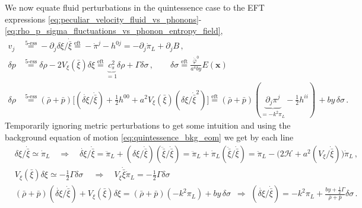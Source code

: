 We now equate fluid perturbations in the quintessence case to the EFT expressions \eqref{eq:peculiar_velocity_fluid_vs_phonons}-\eqref{eq:rho_p_sigma_fluctuations_vs_phonon_entropy_field},
{\small\begin{subequations}\label{eq:perturbations_5essence_vs_eft}
\begin{align}
    v_j & \overset{\text{5-ess}}{=} -\partial_j\delta\xi/\dot{\bar{\xi}} \overset{\text{eft}}{=} -\dot{\pi}^j - h^{0j} = -\partial_j\dot{\pi}_L +\partial_j B\,,\\[2.5pt]
    \delta p &\overset{\text{5-ess}}{=} \delta \rho -2V_\xi(\bar{\xi})\delta\xi 
    \overset{\text{eft}}{=}\underbrace{c_s^2}_{=1} \delta \rho + \Gamma \delta\sigma\,, \qquad \delta\sigma \overset{\text{eft}}{=} \tfrac{\dot{\bar{\varphi}}^0}{a^4by}E(\mathbf{x})\,\\[2.5pt]
    \delta\rho &\overset{\text{5-ess}}{=}(\bar{\rho}+\bar{p})\Big[(\dot{\delta\xi}/\dot{\bar{\xi}})+\tfrac12 h^{00} + a^2V_\xi(\bar{\xi})(\delta\xi/\dot{\bar{\xi}}^2) \Big]\overset{\text{eft}}{=} (\bar{\rho}+\bar{p})(\underbrace{\partial_j\pi^j}_{=-k^2\pi_L}-\tfrac12h^{ii})\,+by\,\delta\sigma\,.
\end{align}\end{subequations}}
Temporarily ignoring metric perturbations to get some intuition and using the background equation of motion \eqref{eq:quintessence_bkg_eom} we get by each line
{\small\begin{subequations}\label{eq:variables_5essence_vs_eft}
\begin{align}
    &\delta\xi/\dot{\bar{\xi}} \simeq \dot{\pi}_L \quad \Rightarrow\quad \dot{\delta\xi}/\dot{\bar{\xi}}=\ddot{\pi}_L+(\delta\xi/\dot{\bar{\xi}})(\ddot{\bar{\xi}}/\dot{\bar{\xi}})= \ddot{\pi}_L+\dot{\pi}_L(\ddot{\bar{\xi}}/\dot{\bar{\xi}})= \ddot{\pi}_L - \big(2\mathcal{H}+a^2(V_\xi/\dot{\bar{\xi}})\big)\dot{\pi}_L\,,\\[2.5pt]
    &V_\xi(\bar{\xi})\delta\xi \simeq  -\tfrac12 \Gamma \delta\sigma\,\quad\Rightarrow\quad V_\xi\dot{\bar{\xi}}\dot{\pi}_L=-\tfrac12 \Gamma \delta\sigma \label{eq:pressure_quintessence_vs_eft_identification}\\[2.5pt]
    &(\bar{\rho}+\bar{p})(\dot{\delta\xi}/\dot{\bar{\xi}})+ V_\xi(\bar{\xi})\delta\xi= (\bar{\rho}+\bar{p})(-k^2\pi_L)+by\,\delta\sigma\,\,\,\Rightarrow\,\, (\dot{\delta\xi}/\dot{\bar{\xi}}) = -k^2\pi_L + \frac{by+\tfrac12 \Gamma}{\bar{\rho}+\bar{p}}\delta\sigma\,.
\end{align}\end{subequations}}
